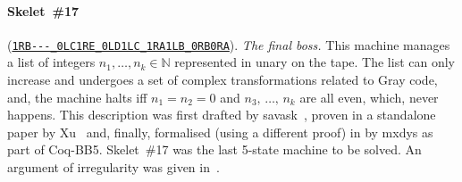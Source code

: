 \documentclass[sigconf,screen]{acmart}
\theoremstyle{definition} %
\numberwithin{equation}{section}
\theoremstyle{definition} %
\newcommand{\tm}[1]{\href{https://bbchallenge.org/#1}{\texttt{\nolinkurl{#1}}}}
\newcommand{\CoqBB}{Coq-BB5\xspace}
\begin{document}
\paragraph{Skelet~\#17} (\tm{1RB---\_0LC1RE\_0LD1LC\_1RA1LB\_0RB0RA}). \textit{The final boss.} This machine manages a list of integers $n_1, \dots, n_k \in \mathbb{N}$ represented in unary on the tape. The list can only increase and undergoes a set of complex transformations related to Gray code, and, the machine halts iff $n_1 = n_2 = 0$ and $n_3,\, \dots,\, n_k$ are all even, which, never happens. This description was first drafted by savask~\cite{savaskSk17}, proven in a standalone paper by Xu~\cite{xu2024skelet17fifthbusy} and, finally, formalised (using a different proof) in \Coq by mxdys as part of \CoqBB. Skelet~\#17 was the last 5-state machine to be solved. An argument of irregularity was given in~\cite{irregularSk17}. 

\balance


\end{document}

